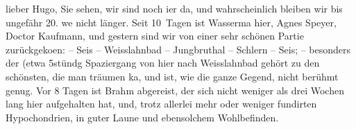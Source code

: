 \pstart{}lieber Hugo,\pend\vspace{0.5em}
\pstart
           Sie sehen, wir sind noch i{\geminationm}er da, und wahrscheinlich
               bleiben wir bis ungefähr 20. we{\geminationn} nicht
               länger. Seit 10 Tagen ist Wasserma{\geminationn} hier, Agnes Speyer, Doctor Kaufmann, und gestern sind wir von einer sehr
               schönen Partie zurückgeko{\geminationm}en: – Seis – Weisslahnbad – Jungbru{\geminationn}thal – Schlern – Seis; – besonders der (etwa 5stündg Spaziergang von hier nach Weisslahnbad gehört zu {\pb}den schönsten, die man träumen ka{\geminationn}, und ist, wie die ganze Gegend, nicht berühmt genug.
               Vor 8 Tagen ist Brahm abgereist, der sich
               nicht weniger als drei Wochen lang hier aufgehalten hat, und, trotz allerlei mehr
               oder weniger fundirten Hypochondrien, in guter Laune und ebensolchem
               Wohlbefinden.\pend
           
